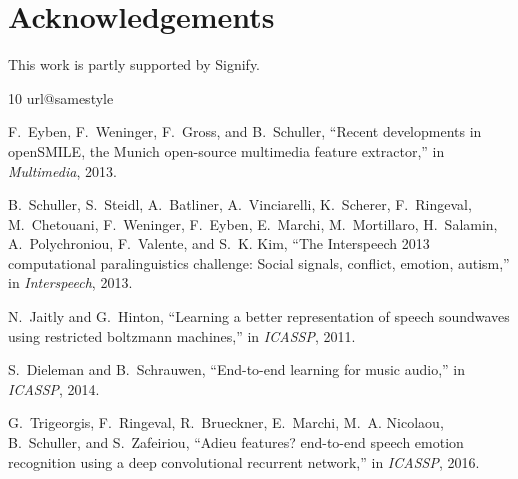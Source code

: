 \documentclass[a4paper]{article}
\begin{document}
\section{Acknowledgements} This work is partly supported by Signify.

\newpage



\begin{thebibliography}{10}
\providecommand{\url}[1]{#1}
\csname url@samestyle\endcsname
\providecommand{\newblock}{\relax}
\providecommand{\bibinfo}[2]{#2}
\providecommand{\BIBentrySTDinterwordspacing}{\spaceskip=0pt\relax}
\providecommand{\BIBentryALTinterwordstretchfactor}{4}
\providecommand{\BIBentryALTinterwordspacing}{\spaceskip=\fontdimen2\font plus
\BIBentryALTinterwordstretchfactor\fontdimen3\font minus
  \fontdimen4\font\relax}
\providecommand{\BIBforeignlanguage}[2]{{\expandafter\ifx\csname l@#1\endcsname\relax
\typeout{** WARNING: IEEEtran.bst: No hyphenation pattern has been}\typeout{** loaded for the language `#1'. Using the pattern for}\typeout{** the default language instead.}\else
\language=\csname l@#1\endcsname
\fi
#2}}
\providecommand{\BIBdecl}{\relax}
\BIBdecl

F.~Eyben, F.~Weninger, F.~Gross, and B.~Schuller, ``Recent developments in
  {openSMILE}, the {Munich} open-source multimedia feature extractor,'' in
  \emph{Multimedia}, 2013.

B.~Schuller, S.~Steidl, A.~Batliner, A.~Vinciarelli, K.~Scherer, F.~Ringeval,
  M.~Chetouani, F.~Weninger, F.~Eyben, E.~Marchi, M.~Mortillaro, H.~Salamin,
  A.~Polychroniou, F.~Valente, and S.~K. Kim, ``The {Interspeech} 2013
  computational paralinguistics challenge: Social signals, conflict, emotion,
  autism,'' in \emph{Interspeech}, 2013.

N.~Jaitly and G.~Hinton, ``Learning a better representation of speech
  soundwaves using restricted boltzmann machines,'' in \emph{ICASSP}, 2011.

S.~Dieleman and B.~Schrauwen, ``End-to-end learning for music audio,'' in
  \emph{ICASSP}, 2014.

G.~Trigeorgis, F.~Ringeval, R.~Brueckner, E.~Marchi, M.~A. Nicolaou,
  B.~Schuller, and S.~Zafeiriou, ``Adieu features? end-to-end speech emotion
  recognition using a deep convolutional recurrent network,'' in \emph{ICASSP},
  2016.


\end{thebibliography}
\end{document}
